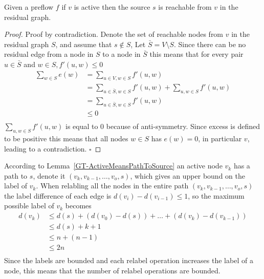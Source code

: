 \begin{lemma} \label{GT-ActiveMeansPathToSource}
Given a preflow $f$ if $v$ is active then the source $s$ is reachable from $v$ in the residual graph.
\end{lemma}
\begin{proof}
Proof by contradiction. Denote the set of reachable nodes from $v$ in the residual graph $S$,
and assume that $s \notin S$, Let $\bar{S} = V \setminus S$. Since there can be no residual edge
from a node in $S$ to a node in $\bar{S}$ this means that for every pair $u \in \bar{S}$ and $w \in S, f'(u,w) \leq 0$ 
\begin{align*}
	\sum_{w \in S}{e(w)}&= \sum_{u \in V, w \in S}{f'(u,w)}\\
	& = \sum_{u \in \bar{S}, w \in S}{f'(u,w)} + \sum_{u, w \in S}{f'(u,w)}\\
	& = \sum_{u \in \bar{S}, w \in S}{f'(u,w)}\\
	&\leq 0\\
\end{align*}
$\sum_{u, w \in S}{f'(u,w)}$ is equal to 0 because of anti-symmetry. Since excess is defined to be positive this means
that all nodes $w \in S$ has $e(w) = 0$, in particular $v$, leading to a contradiction.
$\square$
\end{proof}
According to Lemma~\ref{GT-ActiveMeansPathToSource} an active node $v_k$ has a path to $s$, denote it $(v_k, v_{k-1},\dots,v_o, s)$, which gives an upper bound on the label of $v_k$. 
When relabling all the nodes in the entire path $(v_k, v_{k-1},\dots,v_o, s)$ the label difference of each edge is $d(v_i)-d(v_{i-1}) \leq 1$,
so the maximum possible label of $v_k$ becomes 
\begin{align*}
	d(v_k) &\leq d(s) + (d(v_0)-d(s))+\dots+(d(v_k)-d(v_{k-1}))\\
		&\leq d(s) + k+1\\
		&\leq n + (n-1)\\
		&\leq 2n\\
\end{align*}
Since the labels are bounded and each relabel operation increases the label of a node, this means that the number of relabel operations are bounded.

